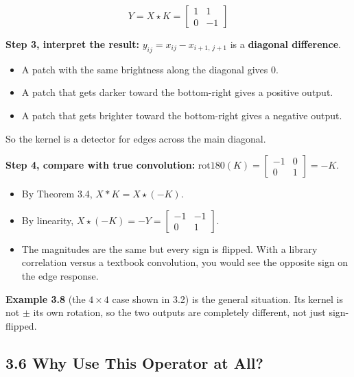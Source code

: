 \[
Y = X \star K = \begin{bmatrix} 1 & 1 \\ 0 & -1 \end{bmatrix}
\]

\textbf{Step 3, interpret the result:} $y_{ij} = x_{ij} - x_{i+1,\, j+1}$ is a \textbf{diagonal difference}.
\begin{itemize}
  \item A patch with the same brightness along the diagonal gives $0$.
  \item A patch that gets darker toward the bottom-right gives a positive output.
  \item A patch that gets brighter toward the bottom-right gives a negative output.
\end{itemize}
So the kernel is a detector for edges across the main diagonal.

\textbf{Step 4, compare with true convolution:} $\mathrm{rot180}(K) = \begin{bmatrix} -1 & 0 \\ 0 & 1 \end{bmatrix} = -K$.
\begin{itemize}
  \item By Theorem 3.4, $X * K = X \star (-K)$.
  \item By linearity, $X \star (-K) = -Y = \begin{bmatrix} -1 & -1 \\ 0 & 1 \end{bmatrix}$.
  \item The magnitudes are the same but every sign is flipped. With a library correlation versus a textbook convolution, you would see the opposite sign on the edge response.
\end{itemize}

\textbf{Example 3.8} (the $4 \times 4$ case shown in 3.2) is the general situation. Its kernel is not $\pm$ its own rotation, so the two outputs are completely different, not just sign-flipped.


\subsection*{3.6 Why Use This Operator at All?}

